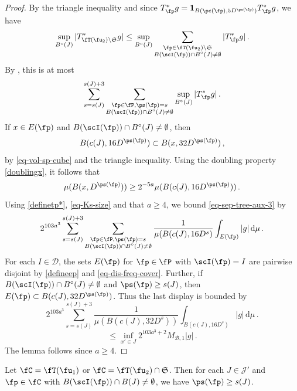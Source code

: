     \begin{proof}
        By the triangle inequality and since $T_{\fp}^* g = \mathbf{1}_{B(\pc(\fp), 5D^{\ps(\fp)})} T_{\fp}^* g$, we have
        $$
            \sup_{B^\circ{}(J)} |T_{\fT(\fu_2) \setminus\mathfrak{S}}^* g|
            \leq \sup_{B^\circ{}(J)} \sum_{\substack{\fp \in \fT(\fu_2) \setminus \mathfrak{S}\\ B(\scI(\fp)) \cap B^\circ(J) \ne \emptyset}} |T_{\fp}^*g|\,.
        $$
        By , this is at most
      \begin{equation}
            \label{eq-sep-tree-aux-3}
            \sum_{s = s(J)}^{s(J) + 3} \sum_{\substack{\fp \in \fP, \ps(\fp) = s\\ B(\scI(\fp)) \cap B^\circ(J) \ne \emptyset}} \sup_{B^\circ{}(J)} |T_{\fp}^* g|\,.
        \end{equation}
        If $x \in E(\fp)$ and $B(\scI(\fp)) \cap B^\circ(J) \ne \emptyset$, then
        $$
            B(c(J), 16D^{\ps(\fp)}) \subset B(x, 32 D^{\ps(\fp)})\,,
        $$
        by \eqref{eq-vol-sp-cube} and the triangle inequality. Using the doubling property \eqref{doublingx}, it follows that
        $$
            \mu(B(x, D^{\ps(\fp)})) \ge 2^{-5a} \mu(B(c(J), 16D^{\ps(\fp)}))\,.
        $$
        Using \eqref{definetp*}, \eqref{eq-Ks-size} and that $a \ge 4$, we bound \eqref{eq-sep-tree-aux-3} by
        $$
            2^{103a^3}\sum_{s = s(J)}^{s(J) + 3} \sum_{\substack{\fp \in \fP, \ps(\fp) = s\\B(\scI(\fp)) \cap B^\circ(J) \ne \emptyset}} \frac{1}{\mu(B(c(J), 16 D^s)} \int_{E(\fp)} |g| \, \mathrm{d}\mu\,.
        $$
        For each $I \in \mathcal{D}$, the sets $E(\fp)$ for $\fp \in \fP$ with $\scI(\fp) = I$ are pairwise disjoint by \eqref{defineep} and \eqref{eq-dis-freq-cover}. Further, if $B(\scI(\fp)) \cap B^\circ(J) \ne \emptyset$ and $\ps(\fp) \ge s(J)$, then $E(\fp) \subset B(c(J), 32 D^{\ps(\fp)})$. Thus the last display is bounded by
        $$
            2^{103a^3}\sum_{s = s(J)}^{s(J) + 3} \frac{1}{\mu(B(c(J), 32 D^s))} \int_{B(c(J), 16 D^s)} |g| \, \mathrm{d}\mu\,.
        $$
        $$
            \le \inf_{x' \in J} 2^{103a^3 +2} M_{\mathcal{B}, 1} |g|\,.
        $$
        The lemma follows since $a \ge 4$.
    \end{proof}

    \begin{lemma}
        \label{scales-impacting-interval}
        \leanok
        Let $\fC = \fT(\fu_1)$ or $\fC = \fT(\fu_2) \cap \mathfrak{S}$. Then for each $J \in \mathcal{J}'$ and $\fp \in \fC$ with $B(\scI(\fp)) \cap B(J) \neq \emptyset$, we have $\ps(\fp) \ge s(J)$.
    \end{lemma}

